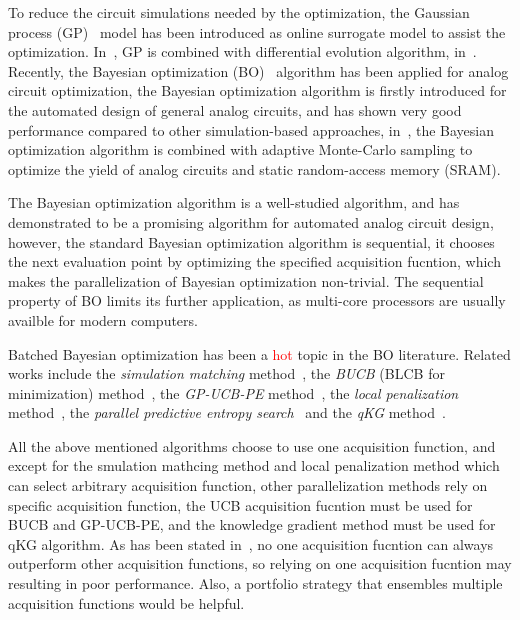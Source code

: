 %
To reduce the circuit simulations needed by the optimization, the Gaussian
process (GP)~\cite{GPML} model has been introduced as online surrogate model to
assist the optimization. In~\cite{liu2014gaspad}, GP is combined with
differential evolution algorithm, in~\cite{lyu2017efficient}. Recently, the
Bayesian optimization (BO)~\cite{shahriari2016taking} algorithm has been applied for analog circuit
optimization, the Bayesian optimization algorithm is firstly introduced for the
automated design of general analog circuits, and has shown very good
performance compared to other simulation-based approaches,
in~\cite{wang2017efficient}, the Bayesian optimization algorithm is combined
with adaptive Monte-Carlo sampling to optimize the yield of analog circuits and
static random-access memory (SRAM).

The Bayesian optimization algorithm is a well-studied algorithm, and has
demonstrated to be a promising algorithm for automated analog circuit design,
however, the standard Bayesian optimization algorithm is sequential, it chooses
the next evaluation point by optimizing the specified acquisition fucntion,
which makes the parallelization of Bayesian optimization non-trivial. The
sequential property of BO limits its further application, as multi-core
processors are usually availble for modern computers. 

Batched Bayesian optimization has been a \textcolor{red}{hot} topic in the BO
literature. Related works include the \emph{simulation matching}
method~\cite{azimi2010batch}, the \emph{BUCB} (BLCB for minimization)
method~\cite{desautels2014parallelizing}, the \emph{GP-UCB-PE}
method~\cite{contal2013parallel}, the \emph{local penalization}
method~\cite{gonzalez2016batch}, the \emph{parallel predictive entropy
search}~\cite{shah2015parallel} and the \emph{qKG}
method~\cite{wu2016parallel}.


All the above mentioned algorithms choose to use one acquisition function, and
except for the smulation mathcing method and local penalization method which
can select arbitrary acquisition function, other parallelization methods rely on
specific acquisition function, the UCB acquisition fucntion must be used for
BUCB and GP-UCB-PE, and the knowledge gradient method must be used for qKG
algorithm. As has been stated in~\cite{hoffman2011portfolio}, no one
acquisition fucntion can always outperform other acquisition functions, so
relying on one acquisition fucntion may resulting in poor performance. Also, a
portfolio strategy that ensembles multiple acquisition functions would be
helpful.


